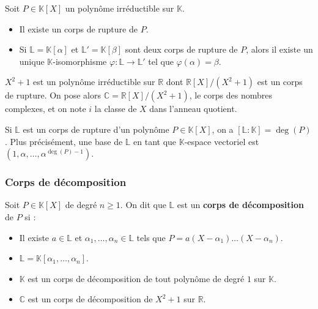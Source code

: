   \begin{theorem}
    Soit $P \in \mathbb{K}[X]$ un polynôme irréductible sur $\mathbb{K}$.
    \begin{itemize}
      \item Il existe un corps de rupture de $P$.
      \item Si $\mathbb{L} = \mathbb{K}[\alpha]$ et $\mathbb{L}' = \mathbb{K}[\beta]$ sont deux corps de rupture de $P$, alors il existe un unique $\mathbb{K}$-isomorphisme $\varphi : \mathbb{L} \rightarrow \mathbb{L}'$ tel que $\varphi(\alpha) = \beta$.
    \end{itemize}
  \end{theorem}

  \begin{application}
    $X^2 + 1$ est un polynôme irréductible sur $\mathbb{R}$ dont $\mathbb{R}[X]/(X^2+1)$ est un corps de rupture. On pose alors $\mathbb{C} = \mathbb{R}[X]/(X^2+1)$, le corps des nombres complexes, et on note $i$ la classe de $X$ dans l'anneau quotient.
  \end{application}

  \begin{remark}
    Si $\mathbb{L}$ est un corps de rupture d'un polynôme $P \in \mathbb{K}[X]$, on a $[\mathbb{L}:\mathbb{K}] = \deg(P)$. Plus précisément, une base de $\mathbb{L}$ en tant que $\mathbb{K}$-espace vectoriel est $(1, \alpha, \dots, \alpha^{\deg(P)-1})$.
  \end{remark}

  \subsubsection{Corps de décomposition}

  \begin{definition}
    Soit $P \in \mathbb{K}[X]$ de degré $n \geq 1$. On dit que $\mathbb{L}$ est un \textbf{corps de décomposition} de $P$ si :
    \begin{itemize}
      \item Il existe $a \in \mathbb{L}$ et $\alpha_1, \dots, \alpha_n \in \mathbb{L}$ tels que $P = a(X-\alpha_1) \dots (X-\alpha_n)$.
      \item $\mathbb{L} = \mathbb{K}[\alpha_1, \dots, \alpha_n]$.
    \end{itemize}
  \end{definition}

  \begin{example}
    \begin{itemize}
      \item $\mathbb{K}$ est un corps de décomposition de tout polynôme de degré $1$ sur $\mathbb{K}$.
      \item $\mathbb{C}$ est un corps de décomposition de $X^2+1$ sur $\mathbb{R}$.
    \end{itemize}
  \end{example}

